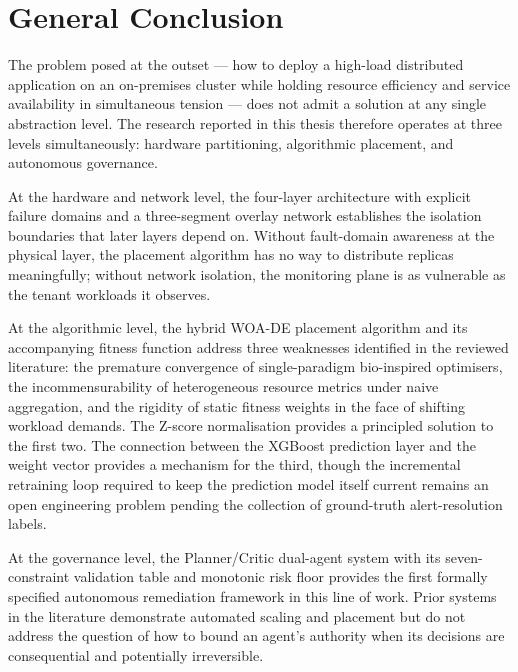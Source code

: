 \documentclass[12pt,a4paper]{report}
\begin{document}
\chapter*{General Conclusion}

The problem posed at the outset --- how to deploy a high-load distributed application
on an on-premises cluster while holding resource efficiency and service availability
in simultaneous tension --- does not admit a solution at any single abstraction
level. The research reported in this thesis therefore operates at three levels
simultaneously: hardware partitioning, algorithmic placement, and autonomous
governance.

At the hardware and network level, the four-layer architecture with explicit failure
domains and a three-segment overlay network establishes the isolation boundaries
that later layers depend on. Without fault-domain awareness at the physical layer,
the placement algorithm has no way to distribute replicas meaningfully; without
network isolation, the monitoring plane is as vulnerable as the tenant workloads it
observes.

At the algorithmic level, the hybrid WOA-DE placement algorithm and its accompanying
fitness function address three weaknesses identified in the reviewed literature:
the premature convergence of single-paradigm bio-inspired optimisers, the
incommensurability of heterogeneous resource metrics under naive aggregation, and
the rigidity of static fitness weights in the face of shifting workload demands. The
Z-score normalisation provides a principled solution to the first two. The connection
between the XGBoost prediction layer and the weight vector provides a mechanism for
the third, though the incremental retraining loop required to keep the prediction
model itself current remains an open engineering problem pending the collection of
ground-truth alert-resolution labels.

At the governance level, the Planner/Critic dual-agent system with its seven-constraint
validation table and monotonic risk floor provides the first formally specified
autonomous remediation framework in this line of work. Prior systems in the literature
demonstrate automated scaling and placement but do not address the question of how
to bound an agent's authority when its decisions are consequential and potentially
irreversible.
\end{document}
